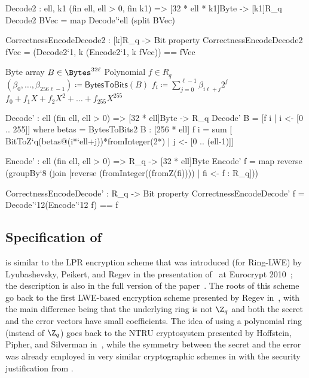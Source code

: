 \begin{code}  
  Decode2 : {ell, k1} (fin ell, ell > 0, fin k1) => [32 * ell * k1]Byte -> [k1]R_q
  Decode2 BVec = map Decode'`{ell} (split BVec)
  
  CorrectnessEncodeDecode2 : [k]R_q -> Bit
  property CorrectnessEncodeDecode2 fVec = (Decode2`{1, k} (Encode2`{1, k} fVec)) == fVec
\end{code}

\begin{algorithm}
  \caption{$\Decode_\ell\colon\Bytes^{32\ell}\rightarrow R_q$
  }
  \label{alg:decode}
  \begin{algorithmic}
    \Require Byte array $B \in \Bytes^{32\ell}$ 
    \Ensure Polynomial $f \in R_q$
    \State $(\beta_0,\dots,\beta_{256\ell-1}) \coloneqq \mathsf{BytesToBits}(B)$
      \State $f_i \coloneqq \sum_{j=0}^{\ell-1}\beta_{i\ell+j}2^{j}$
    \EndFor
    \State \Return $f_0 + f_1X + f_2X^2 + \dots + f_{255}X^{255}$
  \end{algorithmic}
\end{algorithm}

\begin{code}
  Decode' : {ell} (fin ell, ell > 0) => [32 * ell]Byte -> R_q
  Decode' B = [f i | i <- [0 .. 255]]
      where betas = BytesToBits2 B : [256 * ell]
            f i = sum [ BitToZ`{q}(betas@(i*`ell+j))*fromInteger(2^^j)
                      | j <- [0 .. (ell-1)]]
  
  Encode' : {ell} (fin ell, ell > 0) => R_q -> [32 * ell]Byte
  Encode' f = map reverse (groupBy`{8} (join [reverse (fromInteger((fromZ(fi)))) | fi <- f : R_q]))
  
  CorrectnessEncodeDecode' : R_q -> Bit
  property CorrectnessEncodeDecode' f = Decode'`{12}(Encode'`{12} f) == f
\end{code}

\subsection{Specification of \KyberCPAPKE}
\label{subsec:specification:cpaenc}

\KyberCPAPKE is similar to the LPR encryption scheme that was introduced
(for Ring-LWE) by Lyubashevsky, Peikert, and Regev in the presentation
of~\cite{LPR10} at Eurocrypt 2010~\cite{Eurocrypt2010PeikertSlides};
the description is also in the full version of the paper~\cite[Sec.~1.1]{lyubashevsky2013RLWE}.
The roots of this scheme go back to the first LWE-based encryption scheme
presented by Regev in~\cite{regev2005lattices,regev2009lwe}, with the main difference being that the underlying ring is not $\Z_q$ and both the secret and the error vectors have small coefficients.  The idea of using a polynomial ring (instead of $\Z_q$) goes back to the NTRU cryptosystem
presented by Hoffstein, Pipher, and Silverman in~\cite{hoffstein1998ntru}, while the symmetry between the secret and the error was already employed in very similar cryptographic schemes in \cite{DBLP:conf/focs/Alekhnovich03,DBLP:conf/tcc/LyubashevskyPS10} with the security justification from \cite{DBLP:conf/crypto/ApplebaumCPS09}. 

